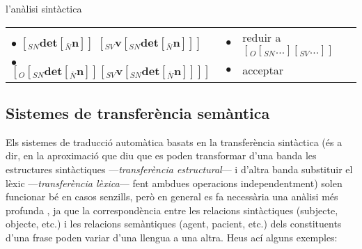 \begin{persabermes}{l'anàlisi sintàctica}
\begin{center}
\begin{tabular}{l|r|l}
  \\
  $\bullet$ $[_{SN} \textbf{det} [_{\bar{N}} \textbf{n} ] ]$
  $[_{SV} \textbf{v}  [_{SN} \textbf{det} [_{\bar{N}} \textbf{n} ] ] ]$
  & 
  $\bullet$
  & 
  reduir a $[_O [_{SN} \ldots ] [_{SV} \ldots ] ]$
  \\
  $\bullet$ $[_O [_{SN} \textbf{det} [_{\bar{N}} \textbf{n} ] ] [_{SV} \textbf{v}  [_{SN} \textbf{det} [_{\bar{N}} \textbf{n} ]
  ] ] ]$
  & 
  $\bullet$
  & 
  acceptar
  \\
  \hline
  \end{tabular}
\end{center}
\end{persabermes}


\subsection{Sistemes de transferència semàntica}
\label{s3:transsem}

Els sistemes de traducció automàtica basats en la transferència
sintàctica (és a dir, en la aproximació que diu que es poden
transformar d'una banda les estructures sintàctiques
---\emph{transferència estructural}--- i d'altra banda substituir el
lèxic ---\emph{transferència lèxica}--- fent ambdues operacions
independentment) solen funcionar bé en casos senzills, però en general
es fa necessària una anàlisi més profunda \citep{hovy93j}, ja que la
correspondència entre les relacions sintàctiques (subjecte, objecte,
etc.)  i les relacions semàntiques (agent, pacient, etc.)  dels
constituents d'una frase poden variar d'una llengua a una altra.  Heus
ací alguns exemples:

